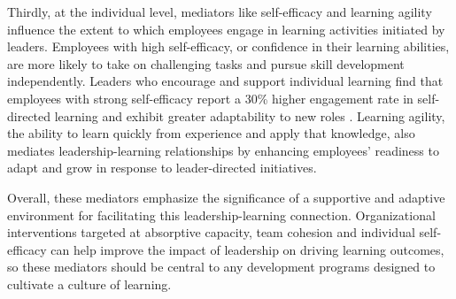 Thirdly, at the individual level, mediators like self-efficacy and learning agility influence the
extent to which employees engage in learning activities initiated by leaders. Employees with high
self-efficacy, or confidence in their learning abilities, are more likely to take on challenging
tasks and pursue skill development independently. Leaders who encourage and support individual
learning find that employees with strong self-efficacy report a 30\% higher engagement rate in
self-directed learning and exhibit greater adaptability to new roles
\cite{OUDEGROOTEBEVERBORG201522}. Learning agility, the ability to learn quickly from experience and
apply that knowledge, also mediates leadership-learning relationships by enhancing employees'
readiness to adapt and grow in response to leader-directed initiatives.

Overall, these mediators emphasize the significance of a supportive and adaptive environment for
facilitating this leadership-learning connection. Organizational interventions targeted at
absorptive capacity, team cohesion and individual self-efficacy can help improve the impact of
leadership on driving learning outcomes, so these mediators should be central to any development
programs designed to cultivate a culture of learning.
